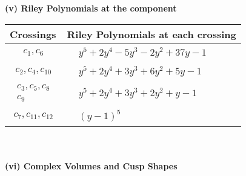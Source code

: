 \documentclass[1p]{elsarticle_modified}
\theoremstyle{definition}
\begin{document}
\newpage\renewcommand{\arraystretch}{1}
\flushleft \textbf{(v) Riley Polynomials at the component}\newline \\
\begin{tabular}{m{50pt}|m{274pt}}
Crossings & \hspace{64pt}Riley Polynomials at each crossing \\
\hline $$\begin{aligned}c_{1},c_{6}\end{aligned}$$&$\begin{aligned}
&y^5+2 y^4-5 y^3-2 y^2+37 y-1
\end{aligned}$\\
\hline $$\begin{aligned}c_{2},c_{4},c_{10}\end{aligned}$$&$\begin{aligned}
&y^5+2 y^4+3 y^3+6 y^2+5 y-1
\end{aligned}$\\
\hline $$\begin{aligned}c_{3},c_{5},c_{8}\\c_{9}\end{aligned}$$&$\begin{aligned}
&y^5+2 y^4+3 y^3+2 y^2+y-1
\end{aligned}$\\
\hline $$\begin{aligned}c_{7},c_{11},c_{12}\end{aligned}$$&$\begin{aligned}
&(y-1)^5
\end{aligned}$\\
\hline
\end{tabular}\\~\\
\newpage\flushleft \textbf{(vi) Complex Volumes and Cusp Shapes}
\end{document}
